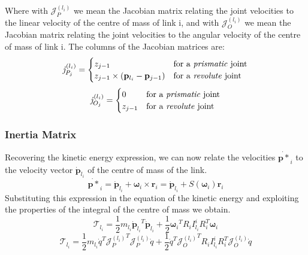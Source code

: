 Where with $\mathcal{J}_P^{(l_i)}$ we mean the Jacobian matrix relating the joint velocities to the linear velocity of the centre of mass of link i, and with $\mathcal{J}_O^{(l_i)}$ we mean the Jacobian matrix relating the joint velocities to the angular velocity of the centre of mass of link i. 
The columns of the Jacobian matrices are:
\begin{equation}
	\mathit{j}_{P_j}^{(l_i)}=
	\begin{cases}
		z_{j-1} & \text{for a \textit{prismatic} joint} \\
		z_{j-1}\times \left(\mathbf{p}_{l_i}-\mathbf{p}_{j-1}\right) & \text{for a \textit{revolute} joint}	
	\end{cases}                                             
\end{equation}
\begin{equation}
	\mathit{j}_{O_j}^{(l_i)}= 
	\begin{cases}
		0 & \text{for a \textit{prismatic} joint} \\
		z_{j-1} & \text{for a \textit{revolute} joint}	
	\end{cases} 
\end{equation}

\subsubsection{Inertia Matrix}
Recovering the kinetic energy expression, we can now relate the velocities $ {\dot{\mathbf{p}*}}_i$ to the velocity vector ${\dot{\mathbf{p}}}_{l_i}$ of the centre of mass of the link.
\begin{equation}
	{\dot{\mathbf{p}*}}_i={\dot{\mathbf{p}}}_{l_i}+\boldsymbol{\omega}_i\times\mathbf{r}_i={\dot{\mathbf{p}}}_{l_i}+S(\boldsymbol{\omega}_i)\mathbf{r}_i
\end{equation}
Substituting this expression in the equation of the kinetic energy and exploiting the properties of the integral of the centre of mass we obtain.
\begin{equation}
	\mathcal{T}_{l_i}= \frac{1}{2}m_{l_i}{{\dot{\mathbf{p}}}_{l_i}}^T{\dot{\mathbf{p}}}_{l_i}+\frac{1}{2}{\boldsymbol{\omega}_i}^TR_iI_{l_i}^iR_i^T\boldsymbol{\omega}_i
\end{equation}
\begin{equation}
	\mathcal{T}_{l_i}= \frac{1}{2}m_{l_i}{\dot{q}}^T{\mathcal{J}_P^{(l_i)}}^T\mathcal{J}_P^{(l_i)}\dot{q}+\frac{1}{2}{\dot{q}}^T{\mathcal{J}_O^{(l_i)}}^TR_iI_{l_i}^iR_i^T\mathcal{J}_O^{(l_i)}\dot{q}
\end{equation}

